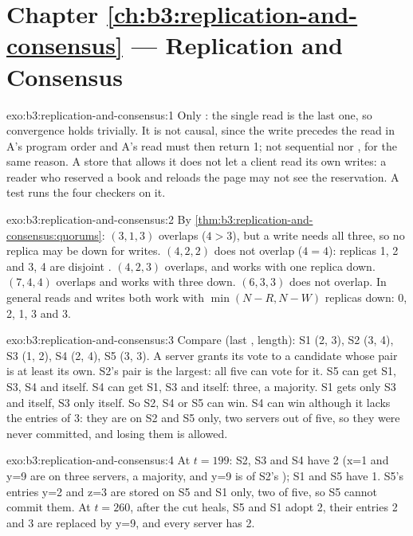 \section*{Chapter \ref{ch:b3:replication-and-consensus} --- Replication and Consensus}

\begin{solution}{exo:b3:replication-and-consensus:1}
Only : the single read is the last one, so convergence holds trivially. It is not causal, since the write precedes the read in A's program order and A's read must then return 1; not sequential nor , for the same reason. A store that allows it does not let a client read its own writes: a reader who reserved a book and reloads the page may not see the reservation. A test runs the four checkers on it.
\end{solution}

\begin{solution}{exo:b3:replication-and-consensus:2}
By \cref{thm:b3:replication-and-consensus:quorums}: $(3, 1, 3)$ overlaps ($4 > 3$), but a write needs all three, so no replica may be down for writes. $(4, 2, 2)$ does not overlap ($4 = 4$): replicas 1, 2 and 3, 4 are disjoint . $(4, 2, 3)$ overlaps, and works with one replica down. $(7, 4, 4)$ overlaps and works with three down. $(6, 3, 3)$ does not overlap. In general reads and writes both work with $\min(N - R, N - W)$ replicas down: 0, 2, 1, 3 and 3.
\end{solution}

\begin{solution}{exo:b3:replication-and-consensus:3}
Compare (last , length): S1 (2, 3), S2 (3, 4), S3 (1, 2), S4 (2, 4), S5 (3, 3). A server grants its vote to a candidate whose pair is at least its own. S2's pair is the largest: all five can vote for it. S5 can get S1, S3, S4 and itself. S4 can get S1, S3 and itself: three, a majority. S1 gets only S3 and itself, S3 only itself. So S2, S4 or S5 can win. S4 can win although it lacks the entries of  3: they are on S2 and S5 only, two servers out of five, so they were never committed, and losing them is allowed.
\end{solution}

\begin{solution}{exo:b3:replication-and-consensus:4}
At $t = 199$: S2, S3 and S4 have  2 (x=1 and y=9 are on three servers, a majority, and y=9 is of S2's ); S1 and S5 have 1. S5's entries y=2 and z=3 are stored on S5 and S1 only, two of five, so S5 cannot commit them. At $t = 260$, after the cut heals, S5 and S1 adopt  2, their entries 2 and 3 are replaced by y=9, and every server has  2.
\end{solution}

